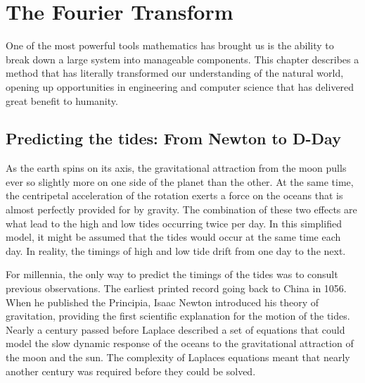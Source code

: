 \documentclass{book}
\begin{document}

\chapter{The Fourier Transform} \label{Fourier}
One of the most powerful tools mathematics has brought us is the ability to break down a large system into manageable components. This chapter describes a method that has literally transformed our understanding of the natural world, opening up opportunities in engineering and computer science that has delivered great benefit to humanity. 


\section{Predicting the tides: From Newton to D-Day}

As the earth spins on its axis, the gravitational attraction from the moon pulls ever so slightly more on one side of the planet than the other. At the same time, the centripetal acceleration of the rotation exerts a force on the oceans that is almost perfectly provided for by gravity. The combination of these two effects are what lead to the high and low tides occurring twice per day. In this simplified model, it might be assumed that the tides would occur at the same time each day. In reality, the timings of high and low tide drift from one day to the next. 

For millennia, the only way to predict the timings of the tides was to consult previous observations. The earliest printed record going back to China in 1056. When he published the Principia, Isaac Newton introduced his theory of gravitation, providing the first scientific explanation for the motion of the tides. Nearly a century passed before Laplace described a set of equations that could model the slow dynamic response of the oceans to the gravitational attraction of the moon and the sun. The complexity of Laplaces equations meant that nearly another century was required before they could be solved. 
\end{document}

